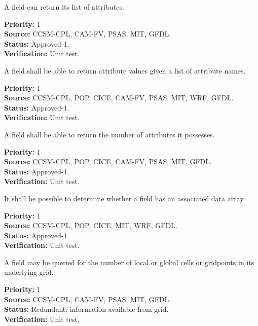A field can return its list of attributes.
\begin{reqlist}
{\bf Priority:} 1 \\
{\bf Source:} CCSM-CPL, CAM-FV, PSAS, MIT, GFDL. \\
{\bf Status:} Approved-1. \\
{\bf Verification:} Unit test. 
\end{reqlist}

A field shall be able to return attribute values given a list of 
attribute names.
\begin{reqlist}
{\bf Priority:} 1 \\
{\bf Source:} CCSM-CPL, POP, CICE, CAM-FV, PSAS, MIT, WRF, GFDL. \\
{\bf Status:} Approved-1. \\
{\bf Verification:} Unit test. 
\end{reqlist}

A field shall be able to return the number of attributes it possesses.
\begin{reqlist}
{\bf Priority:} 1 \\
{\bf Source:} CCSM-CPL, POP, CICE, CAM-FV, PSAS, MIT, GFDL. \\
{\bf Status:} Approved-1. \\
{\bf Verification:} Unit test. 
\end{reqlist}

It shall be possible to determine whether a field has an associated
data array.
\begin{reqlist}
{\bf Priority:} 1 \\
{\bf Source:} CCSM-CPL, POP, CICE, MIT, WRF, GFDL. \\
{\bf Status:} Approved-1. \\
{\bf Verification:} Unit test. 
\end{reqlist}

A field may be queried for the number of local or global cells
or gridpoints in its underlying grid.
\begin{reqlist}
{\bf Priority:} 1 \\
{\bf Source:} CCSM-CPL, CAM-FV, PSAS, MIT, GFDL. \\
{\bf Status:} Redundant: information available from grid. \\
{\bf Verification:} Unit test. 
\end{reqlist}

